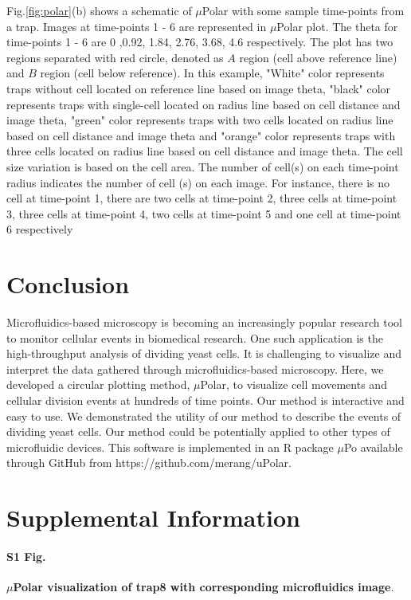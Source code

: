 \documentclass[conference]{IEEEtran}
\begin{document}
Fig.\ref{fig:polar}(b) shows a schematic of $\mu$Polar with some sample time-points from a trap. Images at time-points 1 - 6 are represented in $\mu$Polar plot. The theta for time-points 1 - 6 are 0 ,0.92, 1.84, 2.76, 3.68, 4.6 respectively. The plot has two regions separated with red circle, denoted as $ A $ region (cell above reference line) and $ B $ region (cell below reference). In this example, "White" color represents traps without cell located on reference line based on image theta, "black" color represents traps with single-cell located on radius line based on cell distance and image theta, "green" color represents traps with two cells located on radius line based on cell distance and image theta and "orange" color represents traps with three cells located on radius line based on cell distance and image theta. The cell size variation is based on the cell area. The number of cell(s) on each time-point radius indicates the number of cell (s) on each image. For instance, there is no cell at time-point 1, there are two cells at time-point 2, three cells at time-point 3, three cells at time-point 4, two cells at time-point 5 and one cell at time-point 6 respectively


\section{Conclusion}
Microfluidics-based microscopy is becoming an increasingly popular research tool to monitor cellular events in biomedical research. One such application is the high-throughput analysis of dividing yeast cells. It is challenging to visualize and interpret the data gathered through microfluidics-based microscopy. Here, we developed a circular plotting method, $\mu$Polar, to visualize cell movements and cellular division events at hundreds of time points. Our method is interactive and easy to use. We demonstrated the utility of our method to describe the events of dividing yeast cells. Our method could be potentially applied to other types of microfluidic devices. This software is implemented in an R package $\mu$Po available through GitHub from https://github.com/merang/uPolar.



\section{Supplemental Information}

\paragraph*{S1 Fig.}
\label{S1_Fig}
{\bf  $\mu$Polar visualization of trap8 with corresponding microfluidics image}. 
\end{document}
